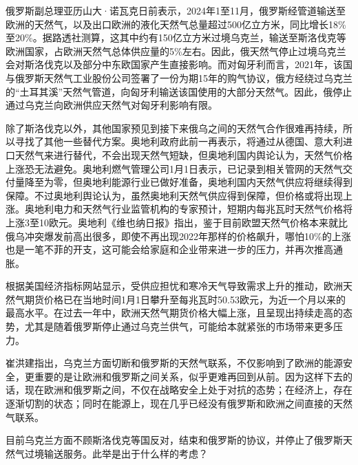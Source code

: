 俄罗斯副总理亚历山大·诺瓦克日前表示，2024年1至11月，俄罗斯经管道输送至欧洲的天然气，以及出口欧洲的液化天然气总量超过500亿立方米，同比增长18\%至20\%。据路透社测算，这其中约有150亿立方米过境乌克兰，输送至斯洛伐克等欧洲国家，占欧洲天然气总体供应量的5\%左右。因此，俄天然气停止过境乌克兰会对斯洛伐克以及部分中东欧国家产生直接影响。而对匈牙利而言，2021年，该国与俄罗斯天然气工业股份公司签署了一份为期15年的购气协议，俄方经绕过乌克兰的“土耳其溪”天然气管道，向匈牙利输送该国使用的大部分天然气。因此，俄停止通过乌克兰向欧洲供应天然气对匈牙利影响有限。

除了斯洛伐克以外，其他国家预见到接下来俄乌之间的天然气合作很难再持续，所以寻找了其他一些替代方案。奥地利政府此前一再表示，将通过从德国、意大利进口天然气来进行替代，不会出现天然气短缺，但奥地利国内舆论认为，天然气价格上涨恐无法避免。奥地利燃气管理公司1月1日表示，已记录到相关管网的天然气交付量降至为零，但奥地利能源行业已做好准备，奥地利国内天然气供应将继续得到保障。不过奥地利舆论认为，虽然奥地利天然气供应得到保障，但价格或将出现上涨。奥地利电力和天然气行业监管机构的专家预计，短期内每兆瓦时天然气价格将上涨3至10欧元。奥地利《维也纳日报》指出，鉴于目前欧盟天然气价格本来就比俄乌冲突爆发前高出很多，即使不再出现2022年那样的价格飙升，哪怕10\%的上涨也是一笔不菲的开支，这可能会给家庭和企业带来进一步的压力，并再次推高通胀。

根据美国经济指标网站显示，受供应担忧和寒冷天气导致需求上升的推动，欧洲天然气期货价格已在当地时间1月1日攀升至每兆瓦时50.53欧元，为近一个月以来的最高水平。在过去一年中，欧洲天然气期货价格大幅上涨，且呈现出持续走高的态势，尤其是随着俄罗斯停止通过乌克兰供气，可能给本就紧张的市场带来更多压力。

崔洪建指出，乌克兰方面切断和俄罗斯的天然气联系，不仅影响到了欧洲的能源安全，更重要的是让欧洲和俄罗斯之间关系，似乎更难再回到从前。因为这样下去的话，现在欧洲和俄罗斯之间，不仅在战略安全上处于对抗的态势；在经济上，存在逐渐切割的状态；同时在能源上，现在几乎已经没有俄罗斯和欧洲之间直接的天然气联系。

目前乌克兰方面不顾斯洛伐克等国反对，结束和俄罗斯的协议，并停止了俄罗斯天然气过境输送服务。此举是出于什么样的考虑？

